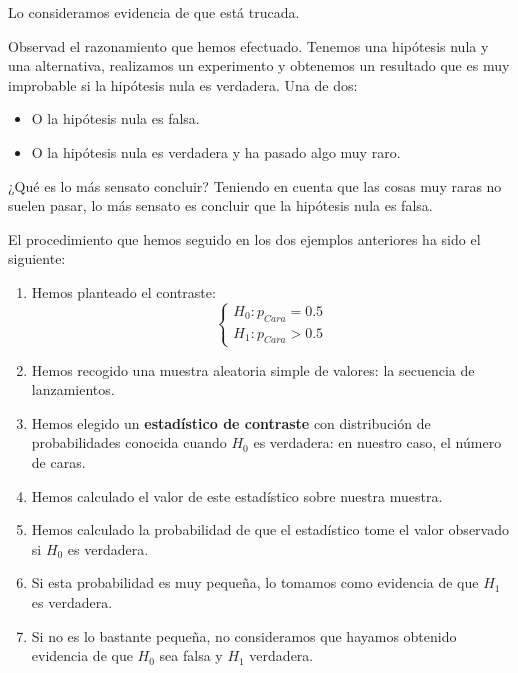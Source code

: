 \documentclass[
  spanish,
  letterpaper,
  DIV=11,
  numbers=noendperiod]{scrreprt}
\providecommand{\tightlist}{%
  \setlength{\itemsep}{0pt}\setlength{\parskip}{0pt}}
\begin{document}
Lo consideramos evidencia de que está trucada.

\begin{tcolorbox}[enhanced jigsaw, arc=.35mm, bottomrule=.15mm, bottomtitle=1mm, breakable, colback=white, colbacktitle=quarto-callout-tip-color!10!white, colframe=quarto-callout-tip-color-frame, coltitle=black, left=2mm, leftrule=.75mm, opacityback=0, opacitybacktitle=0.6, rightrule=.15mm, title=\textcolor{quarto-callout-tip-color}{\faLightbulb}\hspace{0.5em}{Tip}, titlerule=0mm, toprule=.15mm, toptitle=1mm]

Observad el razonamiento que hemos efectuado. Tenemos una hipótesis nula
y una alternativa, realizamos un experimento y obtenemos un resultado
que es muy improbable si la hipótesis nula es verdadera. Una de dos:

\begin{itemize}
\tightlist
\item
  O la hipótesis nula es falsa.
\item
  O la hipótesis nula es verdadera y ha pasado algo muy raro.
\end{itemize}

¿Qué es lo más sensato concluir? Teniendo en cuenta que las cosas muy
raras no suelen pasar, lo más sensato es concluir que la hipótesis nula
es falsa.

\end{tcolorbox}

El procedimiento que hemos seguido en los dos ejemplos anteriores ha
sido el siguiente:

\begin{enumerate}
\def\labelenumi{\arabic{enumi}.}
\item
  Hemos planteado el contraste: \[
  \left\{\begin{array}{ll} 
  H_{0}:p_{\mathit{Cara}}= 0.5\\ 
  H_{1}:p_{\mathit{Cara}}> 0.5
  \end{array}
  \right.
  \]
\item
  Hemos recogido una muestra aleatoria simple de valores: la secuencia
  de lanzamientos.
\item
  Hemos elegido un \textbf{estadístico de contraste} con distribución de
  probabilidades conocida cuando \(H_0\) es verdadera: en nuestro caso,
  el número de caras.
\item
  Hemos calculado el valor de este estadístico sobre nuestra muestra.
\item
  Hemos calculado la probabilidad de que el estadístico tome el valor
  observado si \(H_0\) es verdadera.
\item
  Si esta probabilidad es muy pequeña, lo tomamos como evidencia de que
  \(H_1\) es verdadera.
\item
  Si no es lo bastante pequeña, no consideramos que hayamos obtenido
  evidencia de que \(H_0\) sea falsa y \(H_1\) verdadera.
\end{enumerate}
\end{document}
